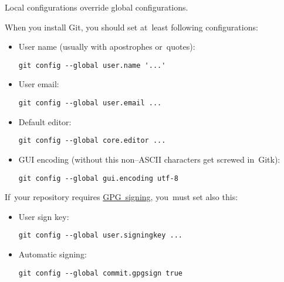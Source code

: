 \warning Local configurations override global configurations.

\label{gitbasicconfiguration}
When you install Git, you should set at~least following configurations:
\begin{itemize}
    \item User name (usually with apostrophes or~quotes):
        \begin{lstlisting}[frame=no, gobble=12]
            git config --global user.name '...'
        \end{lstlisting}
    \item User email:
        \begin{lstlisting}[frame=no, gobble=12]
            git config --global user.email ...
        \end{lstlisting}
    \item Default editor:
        \begin{lstlisting}[frame=no, gobble=12]
            git config --global core.editor ...
        \end{lstlisting}
    \item GUI encoding (without this non--ASCII characters get screwed in~Gitk):
        \begin{lstlisting}[frame=no, gobble=12]
            git config --global gui.encoding utf-8
        \end{lstlisting}
\end{itemize}
\noindent If~your repository requires \hyperref[gitgpg]{GPG~signing}, you~must set also this:
\begin{itemize}
    \item User sign key:
        \begin{lstlisting}[frame=no, gobble=12]
            git config --global user.signingkey ...
        \end{lstlisting}
    \item Automatic signing:
        \begin{lstlisting}[frame=no, gobble=12]
            git config --global commit.gpgsign true
        \end{lstlisting}
\end{itemize}

\label{gitshow}





